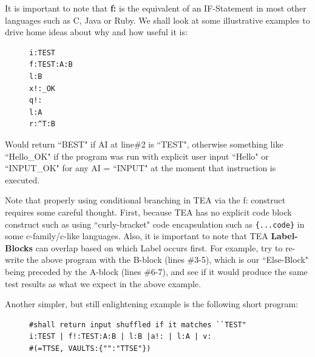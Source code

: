 \documentclass[a4paper, 18pt]{book} %
\begin{document}
\vspace{1em}

It is important to note that \textbf{f:} is the equivalent of an IF-Statement in most other languages such as C, Java or Ruby. We shall look at some illustrative examples to drive home ideas about why and how useful it is:



\begin{figure}[H]
 \Large
  \centering
  \begin{tcolorbox}[teaterminalstyle, title=F: EXAMPLE 1]
  \begin{lstlisting}[language=TEA]
i:TEST
f:TEST:A:B
l:B
x!:_OK
q!:
l:A
r:^T:B 
   \end{lstlisting}
  \end{tcolorbox}
\end{figure}


Would return ``BEST" if AI at line\#2 is ``TEST", otherwise something like ``Hello\_OK" if the program was run with explicit user input ``Hello" or ``INPUT\_OK" for any AI = ``INPUT" at the moment that instruction is executed.

\vspace{1em}

Note that properly using conditional branching in TEA via the f: construct requires some careful thought. First, because TEA has no explicit code block construct such as using ``curly-bracket" code encapsulation such as \texttt{\{...code\}} in some c-family/c-like languages. Also, it is important to note that TEA \textbf{Label-Blocks} can overlap based on which Label occurs first. For example, try to re-write the above program with the B-block (lines \#3-5), which is our ``Else-Block" being preceded by the A-block (lines \#6-7), and see if it would produce the same test results as what we expect in the above example.

\vspace{1em}


Another simpler, but still enlightening example is the following short program:


\begin{figure}[H]
 \Large
  \centering
  \begin{tcolorbox}[teaterminalstyle, title=F: EXAMPLE 2]
  \begin{lstlisting}[language=TEA]
#shall return input shuffled if it matches ``TEST" 
i:TEST | f!:TEST:A:B | l:B |a!: | l:A | v: 
#(=TTSE, VAULTS:{"":"TTSE"})
   \end{lstlisting}
  \end{tcolorbox}
\end{figure}
\end{document}
